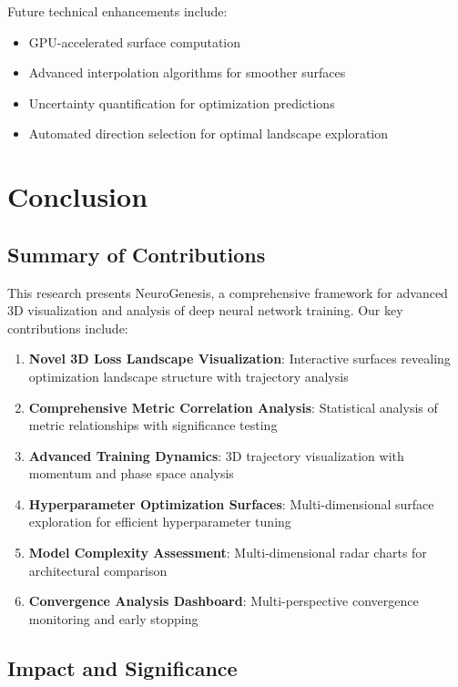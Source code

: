 \documentclass[12pt,a4paper]{article}
\begin{document}
Future technical enhancements include:
\begin{itemize}
    \item GPU-accelerated surface computation
    \item Advanced interpolation algorithms for smoother surfaces
    \item Uncertainty quantification for optimization predictions
    \item Automated direction selection for optimal landscape exploration
\end{itemize}

\section{Conclusion}
\label{sec:conclusion}

\subsection{Summary of Contributions}

This research presents NeuroGenesis, a comprehensive framework for advanced 3D visualization and analysis of deep neural network training. Our key contributions include:

\begin{enumerate}
    \item \textbf{Novel 3D Loss Landscape Visualization}: Interactive surfaces revealing optimization landscape structure with trajectory analysis
    \item \textbf{Comprehensive Metric Correlation Analysis}: Statistical analysis of metric relationships with significance testing
    \item \textbf{Advanced Training Dynamics}: 3D trajectory visualization with momentum and phase space analysis
    \item \textbf{Hyperparameter Optimization Surfaces}: Multi-dimensional surface exploration for efficient hyperparameter tuning
    \item \textbf{Model Complexity Assessment}: Multi-dimensional radar charts for architectural comparison
    \item \textbf{Convergence Analysis Dashboard}: Multi-perspective convergence monitoring and early stopping
\end{enumerate}

\subsection{Impact and Significance}
\end{document}
